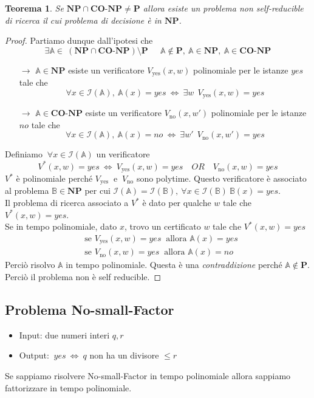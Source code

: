 \documentclass[a4paper]{article}
\newtheorem{thm}{Teorema}[subsection]
\theoremstyle{definition}
\newcommand{\p}{\mathbf{P}}
\newcommand{\np}{\mathbf{NP}}
\newcommand{\conp}{\mathbf{CO}\text{-}\mathbf{NP}}
\newcommand{\prob}[1]{\mathbb{#1}}
\newcommand{\instance}[1]{\mathcal{I}(\prob{#1})}
\begin{document}
		\begin{thm}
			Se $ \np\cap\conp \neq \p $ allora esiste un problema non self-reducible di ricerca il cui problema di decisione è in $ \np $.
		\end{thm}
		
		\begin{proof}
			Partiamo dunque dall'ipotesi che
			\[
				\exists \prob{A}\in\ (\np \cap \conp)\setminus \p\ \quad\ \prob{A}\notin\p,\ \prob{A}\in\np,\ \prob{A}\in\conp
			\]
			\begin{itemize}
				\item[$ \rightarrow $] $ \prob{A}\in\np $ esiste un verificatore $ V_{\text{yes}}(x, w) $ polinomiale per le istanze $ yes $ tale che 
				\[
					\forall x \in \instance{A},\ \prob{A}(x) = yes\ \Leftrightarrow\ \exists w\ \ V_{\text{yes}}(x, w) = yes
				\] 
				\item[$ \rightarrow $] $ \prob{A}\in\conp $ esiste un verificatore $ V_{\text{no}}(x, w') $ polinomiale per le istanze $ no $ tale che 
				\[
					\forall x \in \instance{A},\ \prob{A}(x) = no\ \Leftrightarrow\ \exists w'\ \ V_{\text{no}}(x, w') = yes
				\] 
			\end{itemize}
			Definiamo $ \ \forall x \in \instance{A} $ un verificatore 
			\[
				V^*(x, w) = yes \ \Leftrightarrow\ V_{\text{yes}}(x, w) = yes\quad OR\quad V_{\text{no}}(x, w) = yes
			\]
			$ V^* $ è polinomiale perché $ V_{\text{yes}}\ $ e $\ V_{\text{no}} $ sono polytime. Questo verificatore è associato al problema $ \prob{B}\in \np $ per cui $ \instance{A} = \instance{B},\ \forall x \in \instance{B}\ \prob{B}(x) = yes $.\\
			
			Il problema di ricerca associato a $ V^* $ è dato per qualche $ w $ tale che $ V^*(x, w) = yes $.\\
			
			Se in tempo polinomiale, dato $ x $, trovo un certificato $ w $ tale che  $ V^*(x, w) = yes $
			\begin{align*}
				&\text{se } V_{\text{yes}}(x, w) = yes\ \text{ allora } \prob{A}(x) = yes \\
				&\text{se } V_{\text{no}}(x, w) = yes\ \text{ allora } \prob{A}(x) = no
			\end{align*}
			Perciò risolvo $ \prob{A} $ in tempo polinomiale. Questa è una \textit{contraddizione} perché $ \prob{A}\notin \p $. Perciò il problema non è self reducible.
		\end{proof}
		
	\subsection{Problema No-small-Factor}
		\begin{itemize}
			\item Input: due numeri interi $ q, r $
			\item Output: $\ yes\ \Leftrightarrow\ q $ non ha un divisore $ \leq r $
		\end{itemize}
		Se sappiamo risolvere No-small-Factor in tempo polinomiale allora sappiamo fattorizzare in tempo polinomiale.\\
		
\end{document}
